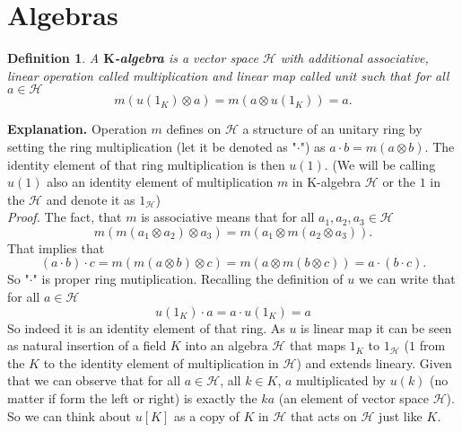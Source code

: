 \documentclass[a4paper, 12pt]{report}
\newtheorem{definition}{Definition}
\begin{document}
\section{Algebras}
\begin{definition}
A \textbf{$\textbf{K}$-algebra} is a vector space $\mathcal{H}$ with additional
associative, linear operation
 called multiplication and linear map
 called unit such that for all $a \in \mathcal{H}$
\begin{equation*}
m(u(1_K) \otimes a) = m(a \otimes u(1_K)) = a.
\end{equation*}
\end{definition}
\textbf{Explanation. } Operation $m$ defines on $\mathcal{H}$ a structure of an unitary ring by setting the
ring multiplication (let it be denoted as "$\cdot$") as $a \cdot b = m(a \otimes b)$. The identity element
of that ring multiplication is then $u(1)$. (We will be calling $u(1)$ also an identity element of
multiplication $m$ in K-algebra $\mathcal{H}$ or the $1$ in the $\mathcal{H}$ and
denote it as $1_\mathcal{H}$)\\
\textit{Proof.} The fact, that $m$ is associative means that for all $a_1, a_2, a_3 \in \mathcal{H}$
\begin{equation*}
m(m(a_1 \otimes a_2) \otimes a_3) = m(a_1 \otimes m(a_2 \otimes a_3)).
\end{equation*}
That implies that
\begin{equation*}
(a\cdot b) \cdot c = m(m(a \otimes b) \otimes c) = m(a \otimes m(b \otimes c)) = a \cdot (b \cdot c).
\end{equation*}
So "$\cdot$" is proper ring mutiplication. Recalling the definition of $u$ we can write that for all
$a \in \mathcal{H}$
\begin{equation*}
u(1_K) \cdot a = a \cdot u(1_K) = a
\end{equation*}
So indeed it is an identity
element of that ring. As $u$ is linear map it can be seen as natural insertion of a field $K$ into an
algebra $\mathcal{H}$ that maps $1_K$ to $1_\mathcal{H}$ ($1$ from the $K$ to the identity element of
multiplication in $\mathcal{H}$) and extends lineary. Given that we can observe
that for all $a \in \mathcal{H}$, all $k \in K$, $a$ multiplicated by $u(k)$ (no matter if form the left
or right) is exactly the $ka$ (an element of vector space $\mathcal{H}$).
So we can think about $u[K]$ as a copy of $K$ in $\mathcal{H}$ that acts on $\mathcal{H}$ just like $K$.\\
\end{document}

